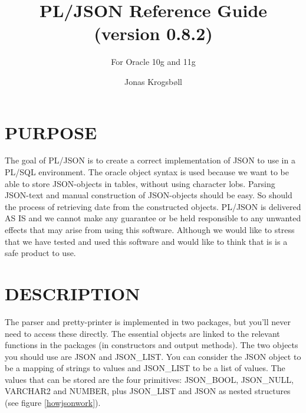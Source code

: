 \documentclass[11pt,twocolumn, a4paper]{article}
\title{PL/JSON Reference Guide (version 0.8.2)}
\subtitle{For Oracle 10g and 11g}
\author{Jonas Krogsbøll}
\date{}
\begin{document}
\maketitle

\section*{PURPOSE}
The goal of PL/JSON is to create a correct implementation of JSON to use in a PL/SQL environment. The oracle object syntax is used because we want to be able to store JSON-objects in tables, without using character lobs. Parsing JSON-text and manual construction of JSON-objects should be easy. So should the process of retrieving date from the constructed objects. PL/JSON is delivered AS IS and we cannot make any guarantee or be held responsible to any unwanted effects that may arise from using this software. Although we would like to stress that we have tested and used this software and would like to think that is is a safe product to use.

\section*{DESCRIPTION}
The parser and pretty-printer is implemented in two packages, but you'll never need to access these directly. The essential objects are linked to the relevant functions in the packages (in constructors and output methods). The two objects you should use are JSON and JSON\_LIST. You can consider the JSON object to be a mapping of strings to values and JSON\_LIST to be a list of values. The values that can be stored are the four primitives: JSON\_BOOL, JSON\_NULL, VARCHAR2 and NUMBER, plus JSON\_LIST and JSON as nested structures (see figure \ref{howjsonwork}).
\end{document}

